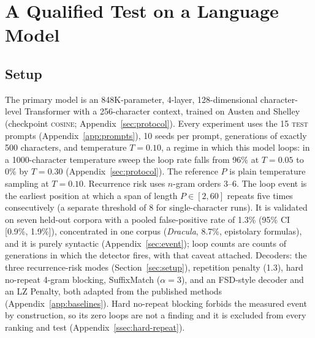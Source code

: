 \section{A Qualified Test on a Language Model}\label{sec:real}

\subsection{Setup}
The primary model is an 848K-parameter, 4-layer, 128-dimensional character-level Transformer with a 256-character context, trained on Austen and Shelley (checkpoint \textsc{cosine}; Appendix~\ref{sec:protocol}). Every experiment uses the 15 \textsc{test} prompts (Appendix~\ref{app:prompts}), 10 seeds per prompt, generations of exactly 500 characters, and temperature $T=0.10$, a regime in which this model loops: in a 1000-character temperature sweep the loop rate falls from 96\% at $T=0.05$ to 0\% by $T=0.30$ (Appendix~\ref{sec:protocol}). The reference $P$ is plain temperature sampling at $T=0.10$. Recurrence risk uses $n$-gram orders 3--6. The loop event is the earliest position at which a span of length $P\in[2,60]$ repeats five times consecutively (a separate threshold of 8 for single-character runs). It is validated on seven held-out corpora with a pooled false-positive rate of 1.3\% (95\% CI [0.9\%, 1.9\%]), concentrated in one corpus (\emph{Dracula}, 8.7\%, epistolary formulas), and it is purely syntactic (Appendix~\ref{sec:event}); loop counts are counts of generations in which the detector fires, with that caveat attached. Decoders: the three recurrence-risk modes (Section~\ref{sec:setup}), repetition penalty (1.3), hard no-repeat 4-gram blocking, SuffixMatch ($\alpha=3$), and an FSD-style decoder and an LZ Penalty, both adapted from the published methods (Appendix~\ref{app:baselines}). Hard no-repeat blocking forbids the measured event by construction, so its zero loops are not a finding and it is excluded from every ranking and test (Appendix~\ref{ssec:hard-repeat}).

